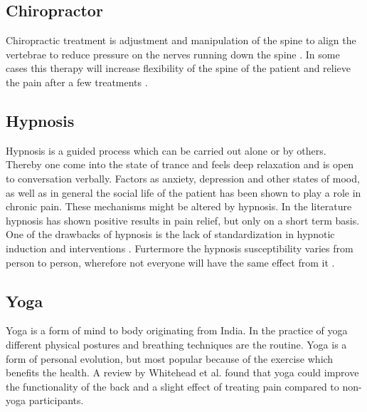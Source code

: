 \subsection{Chiropractor}
Chiropractic treatment is adjustment and manipulation of the spine to align the vertebrae to reduce pressure on the nerves running down the spine \cite{Gerald2013}. In some cases this therapy will increase flexibility of the spine of the patient and relieve the pain after a few treatments \cite{Peterson2012}.

\subsection{Hypnosis}
Hypnosis is a guided process which can be carried out alone or by others. Thereby one come into the state of trance and feels deep relaxation and is open to conversation verbally. \cite{Gerald2013} 
Factors as anxiety, depression and other states of mood, as well as in general the social life of the patient has been shown to play a role in chronic pain. These mechanisms might be altered by hypnosis.
In the literature hypnosis has shown positive results in pain relief, but only on a short term basis. \cite{Dhanani2011}
One of the drawbacks of hypnosis is the lack of standardization in hypnotic induction and interventions \cite{Alkins2010}. Furtermore the hypnosis susceptibility varies from person to person, wherefore not everyone will have the same effect from it \cite{Spiegel2013}.

\subsection{Yoga}
Yoga is a form of mind to body originating from India. In the practice of yoga different physical postures and breathing techniques are the routine. 
Yoga is a form of personal evolution, but most popular because of the exercise which benefits the health. \cite{Whitehead2017}
A review by Whitehead et al. \cite{Whitehead2017} found that yoga could improve the functionality of the back and a slight effect of treating pain compared to non-yoga participants. 

